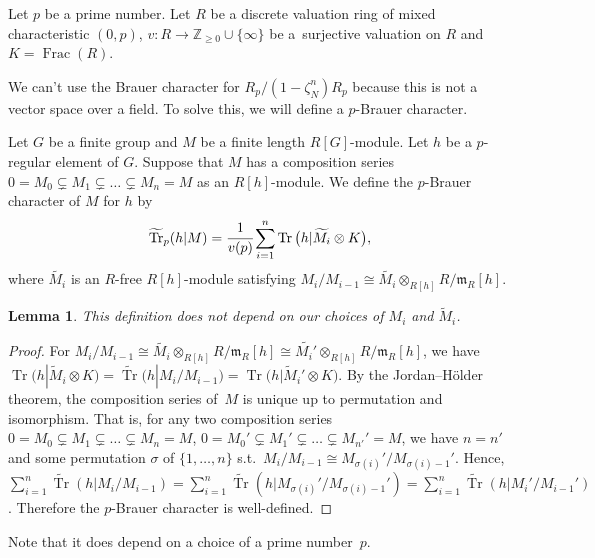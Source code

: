 \documentclass[pdftex]{sigma}%
\numberwithin{equation}{section}
\newtheorem{Lemma}[Theorem]{Lemma}
\begin{document}
Let $p$ be a prime number. Let $R$ be a discrete valuation ring of mixed characteristic $(0,p)$, $v\colon R\rightarrow \mathbb{Z}_{\geq 0}\cup \{ \infty \}$ be a~surjective valuation on $R$ and $K=\operatorname{Frac}(R)$.

We can't use the Brauer character for $R_p/(1-\zeta_N^n)R_p$ because this is not a vector space over a field. To solve this, we will define a $p$-Brauer character.

\begin{Definition}\label{def5.1}
Let $G$ be a finite group and $M$ be a finite length $R[G]$-module. Let $h$ be a $p$-regular element of $G$. Suppose that $M$ has a composition series $0=M_0\subsetneq M_1\subsetneq \dots \subsetneq M_n=M$ as an $R[h]$-module.
 We define the $p$-Brauer character of $M$ for $h$ by
\[
\widetilde{\operatorname{Tr}}_p(h|M)=\cfrac{1}{v(p)} \sum_{i=1}^{n}\operatorname{Tr} \big(h|\widetilde{M_i}\otimes K\big),
\]
 where $\widetilde{M_i}$ is an $R$-free $R[h]$-module satisfying $M_i/M_{i-1} \cong\widetilde{{M}_i}\otimes_{R[h]}R/\mathfrak{m}_R[h]$.
\end{Definition}

\begin{Lemma}
This definition does not depend on our choices of $M_i$ and $\widetilde{M}_i$.
\end{Lemma}

\begin{proof}
For $M_i/M_{i-1} \cong\widetilde{{M}_i}\otimes_{R[h]}R/\mathfrak{m}_R[h]\cong\widetilde{{M}_i'}\otimes_{R[h]}R/\mathfrak{m}_R[h]$, we have $\operatorname{Tr}\big(h|\widetilde{M}_i\otimes K\big)=\widetilde{\operatorname{Tr}}(h|M_i/M_{i-1})=\operatorname{Tr}\big(h|\widetilde{M}_i'\otimes K\big)$. By the Jordan--H\"older theorem, the composition series of~$M$ is unique up to permutation and isomorphism. That is, for any two composition series $0=M_0\subsetneq M_1\subsetneq \dots \subsetneq M_n=M$, $0=M_0'\subsetneq M_1'\subsetneq \dots \subsetneq M_{n'}'=M$, we have $n=n'$ and some permutation $\sigma$ of $\{1,\dots,n\}$ s.t.\ $M_i/M_{i-1}\cong M_{\sigma(i)}'/M_{\sigma(i)-1}'$. Hence, $\sum_{i=1}^{n}\widetilde{\operatorname{Tr}}(h|M_i/M_{i-1})=\sum_{i=1}^{n}\widetilde{\operatorname{Tr}}(h|M_{\sigma(i)}'/M_{\sigma(i)-1}') =\sum_{i=1}^n\widetilde{\operatorname{Tr}}(h|M_i'/M_{i-1}')$. Therefore the $p$-Brauer character is well-defined.
\end{proof}

Note that it does depend on a choice of a prime number~$p$.
\end{document}
